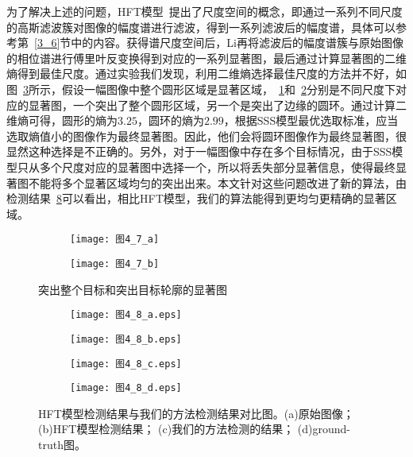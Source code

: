 为了解决上述的问题，HFT模型~\cite{LiJianTPAMI2013Scale}提出了尺度空间的概念，即通过一系列不同尺度的高斯滤波簇对图像的幅度谱进行滤波，得到一系列滤波后的幅度谱，具体可以参考第~\ref{3_6}节中的内容。获得谱尺度空间后，Li再将滤波后的幅度谱簇与原始图像的相位谱进行傅里叶反变换得到对应的一系列显著图，最后通过计算显著图的二维熵得到最佳尺度。通过实验我们发现，利用二维熵选择最佳尺度的方法并不好，如图~\ref{图4_7}所示，假设一幅图像中整个圆形区域是显著区域，~\ref{图4_7_a}和~\ref{图4_7_b}分别是不同尺度下对应的显著图，一个突出了整个圆形区域，另一个是突出了边缘的圆环。通过计算二维熵可得，圆形的熵为$3.25$，圆环的熵为$2.99$，根据SSS模型最优选取标准，应当选取熵值小的图像作为最终显著图。因此，他们会将圆环图像作为最终显著图，很显然这种选择是不正确的。另外，对于一幅图像中存在多个目标情况，由于SSS模型只从多个尺度对应的显著图中选择一个，所以将丢失部分显著信息，使得最终显著图不能将多个显著区域均匀的突出出来。本文针对这些问题改进了新的算法，由检测结果~\ref{图4_8}可以看出，相比HFT模型，我们的算法能得到更均匀更精确的显著区域。
\begin{figure}[t]
  \centering%
  \begin{subfigure}{0.39\textwidth}
    \texttt{[image: 图4\_7\_a]}
    \caption{}
  \label{图4_7_a}
  \end{subfigure}
  \hspace{4em}%
  \begin{subfigure}{0.4\textwidth}
    \texttt{[image: 图4\_7\_b]}
    \caption{}
  \label{图4_7_b}
  \end{subfigure}
  \caption{突出整个目标和突出目标轮廓的显著图}
  \label{图4_7}
\end{figure}
\begin{figure}[b]
  \centering%
  \begin{subfigure}{4cm}
    \texttt{[image: 图4\_8\_a.eps]}
    \caption{}
  \label{图4_8_a}
  \end{subfigure}
  \hspace{4em}%
  \begin{subfigure}{0.25\textwidth}
    \texttt{[image: 图4\_8\_b.eps]}
    \caption{}
  \label{图4_8_b}
  \end{subfigure}
  \hspace{4em}%
  \begin{subfigure}{0.25\textwidth}
    \texttt{[image: 图4\_8\_c.eps]}
    \caption{}
  \label{图4_8_c}
  \end{subfigure}
  \hspace{4em}%
  \begin{subfigure}{0.25\textwidth}
    \texttt{[image: 图4\_8\_d.eps]}
    \caption{}
  \label{图4_8_d}
  \end{subfigure}
  \caption{HFT模型检测结果与我们的方法检测结果对比图。(a)原始图像； (b)HFT模型检测结果； (c)我们的方法检测的结果； (d)ground-truth图。}
  \label{图4_8}
\end{figure}

